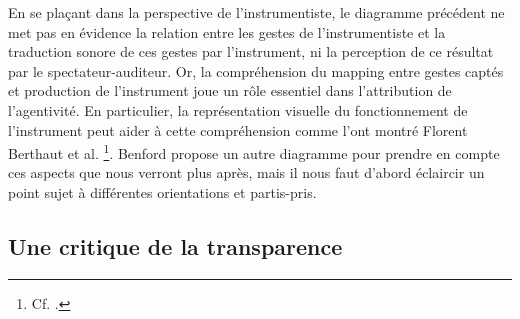 \indent En se plaçant dans la perspective de l'instrumentiste, le diagramme précédent ne met pas en évidence la relation entre les gestes de l'instrumentiste et la traduction sonore de ces gestes par l'instrument, ni la perception de ce résultat par le spectateur-auditeur. Or, la compréhension du mapping entre gestes captés et production de l'instrument joue un rôle essentiel dans l'attribution de l'agentivité. En particulier, la représentation visuelle du fonctionnement de l'instrument peut aider à cette compréhension comme l'ont montré Florent Berthaut et al. \footnote{Cf. \cite{berthaut_rouages:_2013, berthaut_liveness_2015}.}. Benford propose un autre diagramme pour prendre en compte ces aspects que nous verront plus après, mais il nous faut d'abord éclaircir un point sujet à différentes orientations et partis-pris.

\subsection{Une critique de la transparence}
\label{sec:gesture:critique_transparency}


